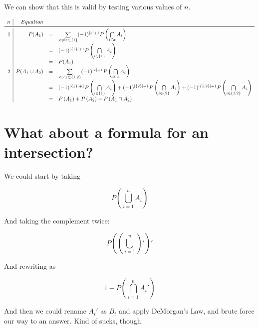 \documentclass{article}
\begin{document}
We can show that this is valid by testing various values of $n$.

\[
\begin{array}{r|rcl}
n & Equation &  \\
\midrule
1 & P(A_1) & = &
\sum\limits_{\varnothing\ne x\subset\{1\}}
(-1)^{|x|+1}
P\left(\bigcap\limits_{i\in x} A_i\right) \\
&& = &
(-1)^{|\{1\}|+1}
P\left(\bigcap\limits_{i\in \{1\}} A_i\right) \\
&& = &
P(A_1) \\

2 & P(A_1\cup A_2) & = &
\sum\limits_{\varnothing\ne x\subset\{1,2\}}
(-1)^{|x|+1}
P\left(\bigcap\limits_{i\in x} A_i\right) \\
&& = &
(-1)^{|\{1\}|+1}
P\left(\bigcap\limits_{i\in \{1\}} A_i\right)
+
(-1)^{|\{2\}|+1}
P\left(\bigcap\limits_{i\in \{2\}} A_i\right)
+
(-1)^{|\{1,2\}|+1}
P\left(\bigcap\limits_{i\in \{1,2\}} A_i\right) \\
&& = &
P\left(A_1\right)
+
P\left(A_2\right)
-
P\left(A_1\cap A_2\right) \\
\end{array}
\]

\section*{What about a formula for an intersection?}

We could start by taking

\[
P\left(\bigcup\limits_{i=1}^n A_i\right)
\]

And taking the complement twice:

\[
P\left(\left(\bigcup\limits_{i=1}^n\right)'\right)'
\]

And rewriting as

\[
1 - P\left(\bigcap\limits_{i=1}^n A_i'\right)
\]

And then we could rename $A_i'$ as $B_i$ and apply DeMorgan's Law, and
brute force our way to an answer. Kind of sucks, though.
\end{document}

